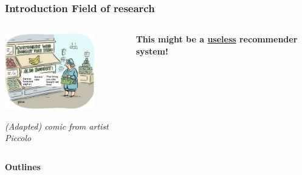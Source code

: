 \documentclass[10pt,frenchb]{beamer}
\begin{document}
\begin{frame}
\frametitle{\textbf{Introduction} Field of research}

\begin{center}\end{center}

\begin{columns}
\begin{column}{0.7\textwidth}
\begin{center}
\includegraphics[height=125px]{images/recommender2.jpeg}
\end{center}
\begin{center}\textit{(Adapted) comic from artist Piccolo}\end{center}
\end{column}

\begin{column}{0.3\textwidth}
\begin{center}\textbf{This might be a \underline{useless} recommender system!}\end{center}
\end{column}
\end{columns}

\end{frame}

\begin{frame}{\textbf{Outlines}}
\tableofcontents
\end{frame}

 \begin{frame}
 \tableofcontents[currentsection]
 \end{frame}
\end{document}
